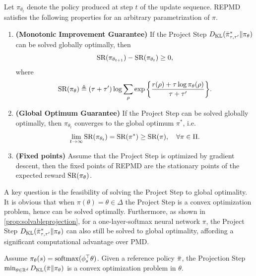 \begin{thm}
\label{thm:monotonically_increasing_sr_property}
Let $\pi_{\theta_{t}}$ denote the policy produced at step $t$ of the update
sequence.
REPMD satisfies the following properties for an arbitrary parametrization of $\pi$.
\begin{enumerate}
	\item {\bf (Monotonic Improvement Guarantee)} 
	If the Project Step $D_{\mathrm{KL}}( \bar{\pi}_{\tau,\tau^{\prime}}^* \| \pi_\theta )$ can be solved globally optimally,
then 
	\begin{equation*}
	\text{SR}(\pi_{\theta_{t+1}}) - \text{SR}(\pi_{\theta_t})\ge 0,
	\end{equation*}
	where
	\begin{equation}
	\label{eq:SR}
	\text{SR}(\pi_\theta) \triangleq (\tau + \tau^{\prime})\log{ \sum_{\rho}{ \exp\left\{ \frac{r(\rho) + \tau \log{\pi_\theta(\rho)} }{\tau + \tau^{\prime}} \right\} }}.
	\end{equation}
	\item  {\bf (Global Optimum Guarantee)} If the Project Step can be solved globally optimally, then $ \pi_{\theta_{t}}$ converges to the global optimum $\pi^*$, i.e. 
	\[
\lim_{t\rightarrow\infty}\text{SR}(\pi_{\theta_t})=
	\text{SR}(\pi^*) \ge  \text{SR}(\pi), \quad \forall \pi\in\Pi.
	\]
	\item {\bf (Fixed points)} Assume that the Project Step is optimized by gradient descent, then the fixed points of REPMD are the 
	stationary points of the expected reward $\text{SR}(\pi_\theta)$. 
\end{enumerate}
\end{thm}

A key question is the feasibility of solving the
Project Step to global optimality.
It is obvious that when $\pi(\theta) = \theta \in \Delta$
the Project Step is a convex optimization problem,
hence can be solved optimally.
Furthermore, as shown in \cref{prop:solvableprojection}, 
for a one-layer-softmax neural network $\pi$,
the Project Step $D_{\mathrm{KL}}( \bar{\pi}_{\tau,\tau^{\prime}}^* \| \pi_\theta)$
can also still be solved to global optimality,
affording a significant computational advantage over PMD.

\begin{prop}
\label{prop:solvableprojection}
Assume $\pi_\theta(s) = \mathrm{softmax}(\phi_s^{\top}\theta)$.
Given a reference policy $\bar{\pi}$,
the Projection Step
$\min\nolimits_{\theta \in \mathbb{R}^d}{D_{\mathrm{KL}}(\bar{\pi} \| \pi_\theta)}$
is a convex optimization problem in $\theta$.
\end{prop}

